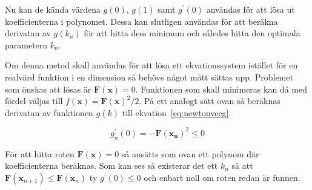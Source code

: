 \noindent
Nu kan de kända värdena $g(0)$, $g(1)$ samt $g^\prime(0)$ användas för att lösa ut koefficienterna i polynomet.
Dessa kan slutligen användas för att beräkna derivatan av $g(k_n)$ för att hitta dess minimum och således
hitta den optimala parametern $k_n$.

\noindent
Om denna metod skall användas för att lösa ett ekvationssystem istället för en realvärd funktion i en dimension
så behövs något mått sättas upp. Problemet som önskas att lösas är $\mathbf{F}(\mathbf{x}) = 0$.
Funktionen som skall minimeras kan då med fördel väljas till $f(\mathbf{x}) = \mathbf{F}(\mathbf{x})^2/2$.
På ett analogt sätt ovan så beräknas derivatan av funktionen $g(k)$ till ekvation~\eqref{eq:newtonvecg}.\cite{fortran77}

\begin{equation}
\label{eq:newtonvecg}
g_n^\prime(0) = - \mathbf{F}(\mathbf{x_n})^2 \le 0
\end{equation}

\noindent
För att hitta roten $\mathbf{F}(\mathbf{x}) = 0$ så ansätts som ovan ett polynom där koefficienterna beräknas.
Som kan ses så existerar det ett $k_n$ så att $\mathbf{F}(\mathbf{x}_{n+1}) \le \mathbf{F}(\mathbf{x}_n)$ ty
$g^\prime(0) \le 0$ och enbart noll om roten redan är funnen.

